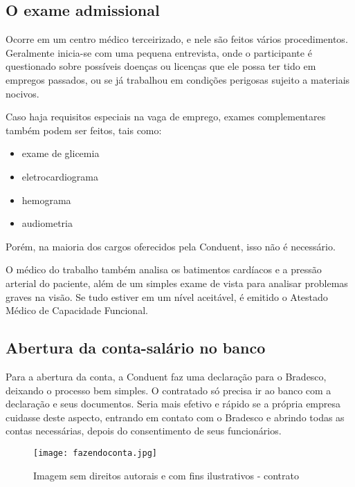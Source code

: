 \documentclass[12pt]{article}
\begin{document}
\newpage

\subsection{O exame admissional}

Ocorre em um centro médico terceirizado, e nele são feitos vários procedimentos. Geralmente inicia-se com uma pequena entrevista, onde o participante é questionado sobre possíveis doenças ou licenças que ele possa ter tido em empregos passados, ou se já trabalhou em condições perigosas sujeito a materiais nocivos. 

Caso haja requisitos especiais na vaga de emprego, exames complementares também podem ser feitos, tais como: 

\begin{itemize}
\item exame de glicemia
\item eletrocardiograma
\item hemograma
\item audiometria

\end{itemize}

 Porém, na maioria dos cargos oferecidos pela Conduent, isso não é necessário.

O médico do trabalho também analisa os batimentos cardíacos e a pressão arterial do paciente, além de um simples exame de vista para analisar problemas graves na visão. Se tudo estiver em um nível aceitável, é emitido o Atestado Médico de Capacidade Funcional.

\newpage
\subsection{Abertura da conta-salário no banco}

Para a abertura da conta, a Conduent faz uma declaração para o Bradesco, deixando o processo bem simples. O contratado só precisa ir ao banco com a declaração e seus documentos. Seria mais efetivo e rápido se a própria empresa cuidasse deste aspecto, entrando em contato com o Bradesco e abrindo todas as contas necessárias, depois do consentimento de seus funcionários.


\begin{figure}[h]
	\centering
	\texttt{[image: fazendoconta.jpg]}
	\caption{Imagem sem direitos autorais e com fins ilustrativos - contrato}
	\label{fig:mesh1}
\end{figure}
\end{document}
